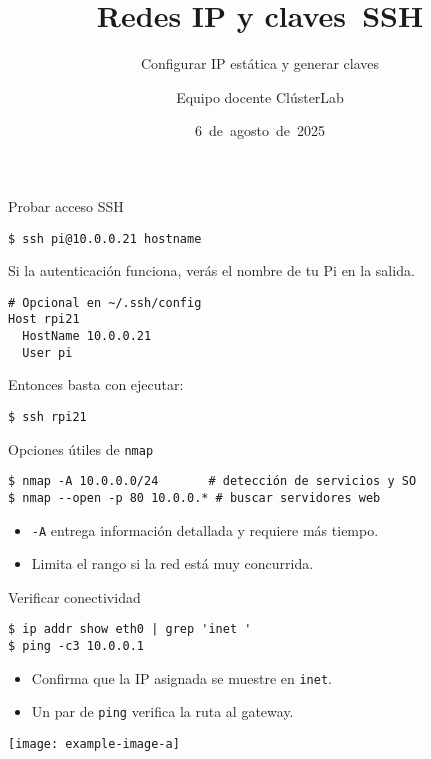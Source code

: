 \documentclass[aspectratio=169,professionalfonts]{beamer}
\title[ClústerLab • Día 2]{Redes IP y claves SSH}
\subtitle{Configurar IP estática y generar claves}
\author{Equipo docente ClústerLab}
\date{6 de agosto de 2025}
\begin{document}
\begin{frame}[plain]
  \titlepage
\end{frame}

\begin{frame}[fragile]{Probar acceso SSH}
  \begin{verbatim}
$ ssh pi@10.0.0.21 hostname
  \end{verbatim}
  Si la autenticación funciona, verás el nombre de tu Pi en la salida.
  \begin{verbatim}
# Opcional en ~/.ssh/config
Host rpi21
  HostName 10.0.0.21
  User pi
  \end{verbatim}
  Entonces basta con ejecutar:
  \begin{verbatim}
$ ssh rpi21
  \end{verbatim}
\end{frame}

\begin{frame}[fragile]{Opciones útiles de \texttt{nmap}}
  \begin{verbatim}
$ nmap -A 10.0.0.0/24       # detección de servicios y SO
$ nmap --open -p 80 10.0.0.* # buscar servidores web
  \end{verbatim}
  \begin{itemize}
    \item \texttt{-A} entrega información detallada y requiere más tiempo.
    \item Limita el rango si la red está muy concurrida.
  \end{itemize}
\end{frame}

\begin{frame}[fragile]{Verificar conectividad}
  \begin{verbatim}
$ ip addr show eth0 | grep 'inet '
$ ping -c3 10.0.0.1
  \end{verbatim}
  \begin{itemize}
    \item Confirma que la IP asignada se muestre en \texttt{inet}.
    \item Un par de \texttt{ping} verifica la ruta al gateway.
  \end{itemize}
  \begin{center}
    \texttt{[image: example-image-a]}
  \end{center}
\end{frame}
\end{document}
